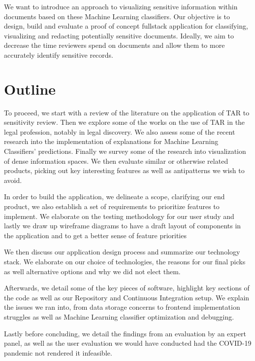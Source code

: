 \documentclass[\version]{l4proj}
\begin{document}
We want to introduce an approach to visualizing sensitive information within documents based on these Machine Learning classifiers.
Our objective is to design, build and evaluate a proof of concept fullstack application for classifying, visualizing and redacting potentially sensitive documents.
Ideally, we aim to decrease the time reviewers spend on documents and allow them to more accurately identify sensitive records.

\section{Outline}

To proceed, we start with a review of the literature on the application of TAR to sensitivity review.
Then we explore some of the works on the use of TAR in the legal profession, notably in legal discovery.
We also assess some of the recent research into the implementation of explanations for Machine Learning Classifiers' predictions.
Finally we survey some of the research into visualization of dense information spaces.
We then evaluate similar or otherwise related products, picking out key interesting features as well as antipatterns we wish to avoid.

In order to build the application, we delineate a scope, clarifying our end product, we also establish a set of requirements to prioritize features to implement.
We elaborate on the testing methodology for our user study and lastly we draw up wireframe diagrams to have a draft layout of components in the application and to get a better sense of feature priorities

We then discuss our application design process and summarize our technology stack. We elaborate on our choice of technologies, the reasons for our final picks as well alternative options and why we did not elect them.

Afterwards, we detail some of the key pieces of software, highlight key sections of the code as well as our Repository and Continuous Integration setup.
We explain the issues we ran into, from data storage concerns to frontend implementation struggles as well as Machine Learning classifier optimization and debugging.

Lastly before concluding, we detail the findings from an evaluation by an expert panel, as well as the user evaluation we would have conducted had the COVID-19 pandemic not rendered it infeasible.
\end{document}
